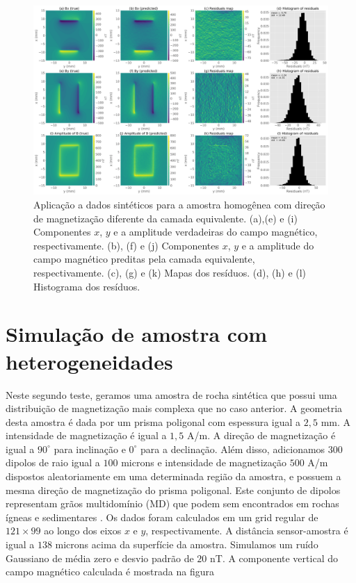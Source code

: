 \begin{figure}
	\centering
	\includegraphics[width=1.15\textwidth]{Fig/mag_vec/amostra_homo_errado/comparison_true_estimated.png}
	\caption{Aplicação a dados sintéticos para a amostra homogênea com direção de magnetização diferente da camada equivalente. (a),(e) e (i) Componentes $x$, $y$ e a amplitude verdadeiras do campo magnético, respectivamente. (b), (f) e (j) Componentes $x$, $y$ e a amplitude do campo magnético preditas pela camada equivalente, respectivamente. (c), (g) e (k) Mapas dos resíduos. (d), (h) e (l) Histograma dos resíduos.}
	\label{fig:comparison_homo_sample_difdir}
\end{figure}


\section{Simulação de amostra com heterogeneidades}
\label{sec:hetero_sample}

Neste segundo teste, geramos uma amostra de rocha sintética que possui uma distribuição de magnetização mais complexa que no caso anterior. A geometria desta amostra é dada por um prisma poligonal com espessura igual a $2,5$ mm. A intensidade de magnetização é igual a $1,5$ A/m. A direção de magnetização é igual a $90^\circ$ para inclinação e $0^\circ$ para a declinação. Além disso, adicionamos $300$ dipolos de raio igual a $100$ microns e intensidade de magnetização $500$ A/m dispostos aleatoriamente em uma determinada região da amostra, e possuem a mesma direção de magnetização do prisma poligonal. Este conjunto de dipolos representam grãos multidomínio (MD) que podem sem encontrados em rochas ígneas e sedimentares \citep{dunlop1997,butler1998,clark1997}. Os dados foram calculados em um grid regular de $121 \times 99$ ao longo dos eixos $x$ e $y$, respectivamente. A distância sensor-amostra é igual a $138$ microns acima da superfície da amostra. Simulamos um ruído Gaussiano de média zero e desvio padrão de $20$ nT. A componente vertical do campo magnético calculada é mostrada na figura

